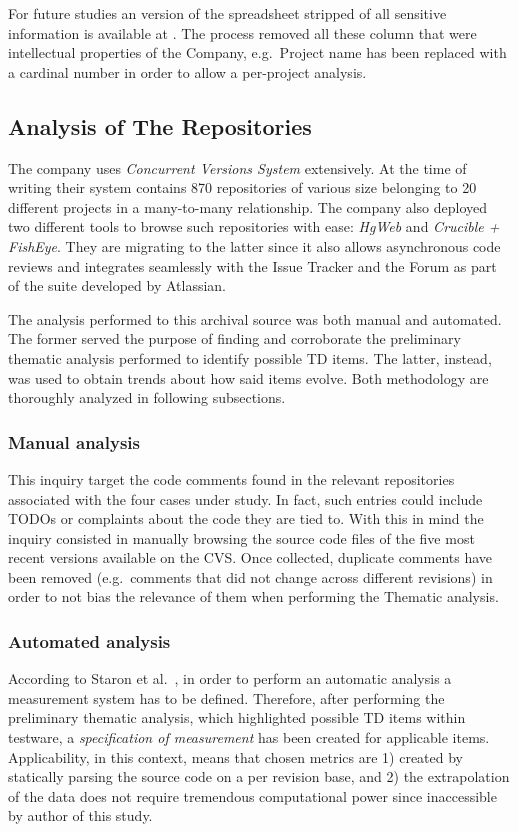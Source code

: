 For future studies an version of the spreadsheet stripped of all sensitive information is available at . The process removed all these column that were intellectual properties of the Company, e.g.\ Project name has been replaced with a cardinal number in order to allow a per-project analysis.


\subsection{Analysis of The Repositories} \label{sec:analysis_of_the_repos}
The company uses \textit{Concurrent Versions System} extensively. At the time of writing their system contains 870 repositories of various size belonging to 20 different projects in a many-to-many relationship. The company also deployed two different tools to browse such repositories with ease: \textit{HgWeb} and \textit{Crucible + FishEye}. They are migrating to the latter since it also allows asynchronous code reviews and integrates seamlessly with the Issue Tracker and the Forum as part of the suite developed by Atlassian.

The analysis performed to this archival source was both manual and automated. The former served the purpose of finding and corroborate the preliminary thematic analysis performed to identify possible TD items. The latter, instead, was used to obtain trends about how said items evolve. Both methodology are thoroughly analyzed in following subsections.

\subsubsection{Manual analysis}
    This inquiry target the code comments found in the relevant repositories associated with the four cases under study. In fact, such entries could include TODOs or complaints about the code they are tied to. With this in mind the inquiry consisted in manually browsing the source code files of the five most recent versions available on the CVS. Once collected, duplicate comments have been removed (e.g.\ comments that did not change across different revisions) in order to not bias the relevance of them when performing the Thematic analysis.


\subsubsection{Automated analysis} \label{sec:automated_analysis}
    According to Staron et al.\ \cite{metrics_paper}, in order to perform an automatic analysis a measurement system has to be defined. Therefore, after performing the preliminary thematic analysis, which highlighted possible TD items within testware, a \textit{specification of measurement} has been created for applicable items. Applicability, in this context, means that chosen metrics are 1) created by statically parsing the source code on a per revision base, and 2) the extrapolation of the data does not require tremendous computational power since inaccessible by author of this study.

